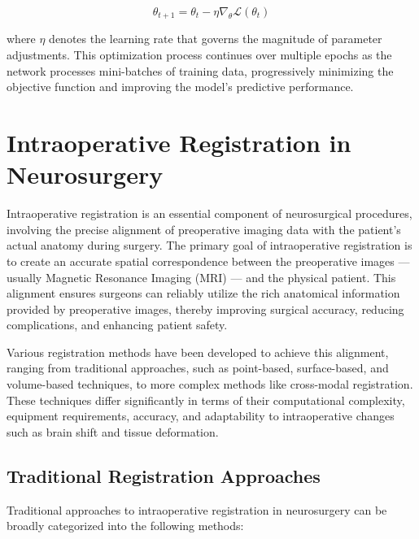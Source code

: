 \begin{equation}
\theta_{t+1} = \theta_t - \eta \nabla_\theta \mathcal{L}(\theta_t)
\end{equation}

\noindent where $\eta$ denotes the learning rate that governs the magnitude of parameter adjustments. This optimization process continues over multiple epochs as the network processes mini-batches of training data, progressively minimizing the objective function and improving the model's predictive performance.

\section{Intraoperative Registration in Neurosurgery}

Intraoperative registration is an essential component of neurosurgical procedures, involving the precise alignment of preoperative imaging data with the patient's actual anatomy during surgery. The primary goal of intraoperative registration is to create an accurate spatial correspondence between the preoperative images — usually Magnetic Resonance Imaging (MRI) — and the physical patient. \textcite{fehrentz2024intraoperative} This alignment ensures surgeons can reliably utilize the rich anatomical information provided by preoperative images, thereby improving surgical accuracy, reducing complications, and enhancing patient safety.

Various registration methods have been developed to achieve this alignment, ranging from traditional approaches, such as point-based, surface-based, and volume-based techniques, to more complex methods like cross-modal registration. These techniques differ significantly in terms of their computational complexity, equipment requirements, accuracy, and adaptability to intraoperative changes such as brain shift and tissue deformation.
\subsection{Traditional Registration Approaches}

Traditional approaches to intraoperative registration in neurosurgery can be broadly categorized into the following methods:

